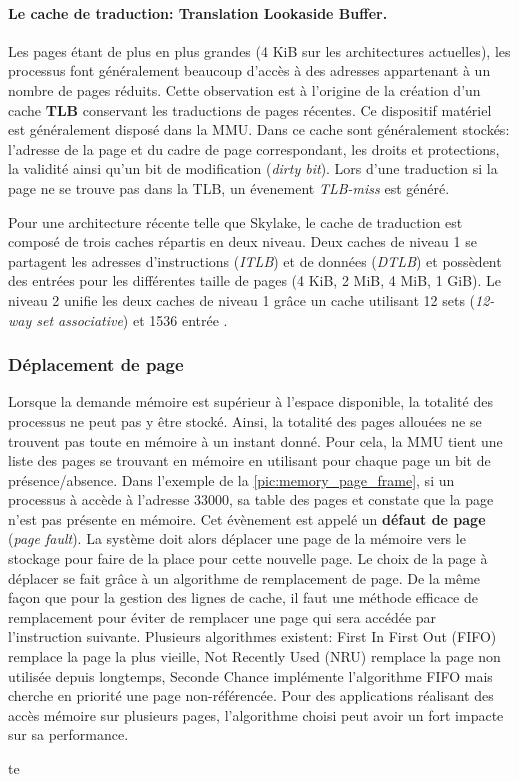 \paragraph{Le cache de traduction: Translation Lookaside Buffer.} \label{sec:tlb}
Les pages étant de plus en plus grandes (4 KiB sur les architectures actuelles), les processus font généralement beaucoup d'accès à des adresses appartenant à un nombre de pages réduits. Cette observation est à l'origine de la création d'un cache \textbf{TLB} conservant les traductions de pages récentes. Ce dispositif matériel est généralement disposé dans la MMU. Dans ce cache sont généralement stockés: l'adresse de la page et du cadre de  page correspondant, les droits et protections, la validité ainsi qu'un bit de modification (\textit{dirty bit}). Lors d'une traduction si la page ne se trouve pas dans la TLB, un évenement \textit{TLB-miss} est généré.


Pour une architecture récente telle que Skylake, le cache de traduction est composé de trois caches répartis en deux niveau. Deux caches de niveau 1 se partagent les adresses d'instructions (\textit{ITLB}) et de données (\textit{DTLB}) et possèdent des entrées pour les différentes taille de pages (4 KiB, 2 MiB, 4 MiB, 1 GiB). Le niveau 2 unifie les deux caches de niveau 1 grâce un cache utilisant 12 sets  (\textit{12-way set associative}) et 1536 entrée \cite{Wikichipb}.




\subsubsection{Déplacement de page} \label{sec:deplacement_page}
Lorsque la demande mémoire est supérieur à l'espace disponible, la totalité des processus ne peut pas y être stocké. Ainsi, la totalité des pages allouées ne se trouvent pas toute en mémoire à un instant donné. Pour cela, la MMU tient une liste des pages se trouvant en mémoire en utilisant pour chaque page un bit de présence/absence. Dans l'exemple de la \autoref{pic:memory_page_frame}, si un processus à accède à l'adresse $33000$, sa table des pages et constate que la page n'est pas présente en mémoire. Cet évènement est appelé un \textbf{défaut de page} (\textit{page fault}). La système doit alors déplacer une page de la mémoire vers le stockage pour faire de la place pour cette nouvelle page. Le choix de la page à déplacer se fait grâce à un algorithme de remplacement de page. De la même façon que pour la gestion des lignes de cache, il faut une méthode efficace de remplacement pour éviter de remplacer une page qui sera accédée par l'instruction suivante. Plusieurs algorithmes existent: First In First Out (FIFO) remplace la page la plus vieille, Not Recently Used (NRU) remplace la page non utilisée depuis longtemps, Seconde Chance implémente l'algorithme FIFO mais cherche en priorité une page non-référencée. Pour des applications réalisant des accès mémoire sur plusieurs pages, l'algorithme choisi peut avoir un fort impacte sur sa performance.



te